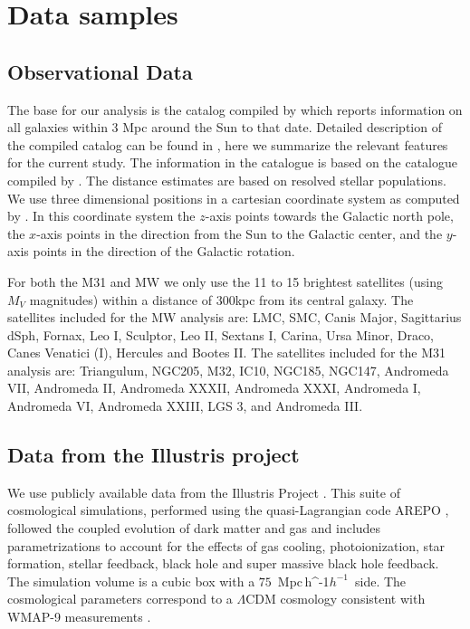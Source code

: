 \documentclass[a4paper,fleqn,usenatbib]{mnras}
\newcommand{\Mpch}{\,{\rm Mpc}\,\ifmmode h^{-1}\else $h^{-1}$\fi}
\begin{document}
\section{Data samples}\label{sec:DataSamples}

\subsection{Observational Data}
\label{sec:obs}

The base for our analysis is the catalog compiled by
\cite{2014yCat..74351928P} which reports information on all 
galaxies within 3 Mpc around the Sun to that date. 
Detailed description of the compiled catalog can be found in
\cite{2013MNRAS.435.1928P}, here we summarize the relevant features
for the current study.
The information in the catalogue is based on the catalogue compiled by
\cite{2012AJ....144....4M}.
The distance estimates are based on resolved stellar populations. 
We use three dimensional positions in a cartesian coordinate system
as computed by \cite{2013MNRAS.435.1928P}.
In this coordinate system the $z$-axis points towards the Galactic north pole, the
$x$-axis points in the direction from the Sun to the Galactic center,
and the $y$-axis points in the direction of the Galactic rotation.


For both the M31 and MW we only use the 11 to 15 brightest satellites (using
$M_V$ magnitudes) within a distance of $300$kpc from its central galaxy.
The satellites included for the MW analysis are: 
LMC, SMC, Canis Major, Sagittarius dSph, Fornax, Leo I, Sculptor,
Leo II, Sextans I, Carina, Ursa Minor, Draco, Canes Venatici (I),
Hercules and Bootes II.
The satellites included for the M31 analysis are: Triangulum, NGC205,
M32, IC10, NGC185, NGC147, Andromeda VII, Andromeda II, Andromeda
XXXII, Andromeda XXXI, Andromeda I, Andromeda VI, Andromeda XXIII, LGS 3, 
 and Andromeda III.



\subsection{Data from the Illustris project}
\label{sec:illustris}

We use publicly available data from the Illustris Project 
\citep{2014MNRAS.444.1518V}. 
This suite of cosmological simulations, performed using the quasi-Lagrangian
code AREPO \citep{2010MNRAS.401..791S}, followed the coupled evolution of dark 
matter and gas and includes parametrizations to account for the effects of
gas cooling, photoionization, star formation, stellar feedback, black
hole and super massive black hole feedback. 
The simulation volume is a cubic box with a $75$ \Mpch\ side.
The cosmological parameters correspond to a $\Lambda$CDM cosmology
consistent with WMAP-9 measurements \citep{2013ApJS..208...19H}. 
\end{document}
